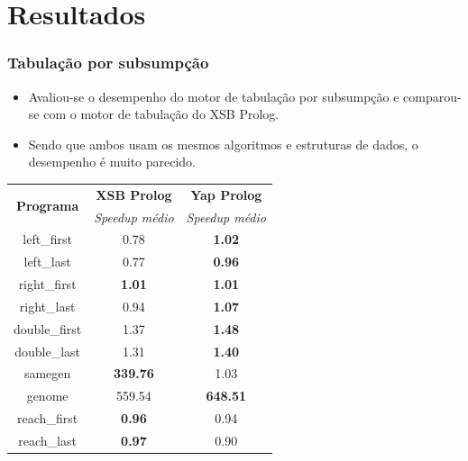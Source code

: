 \documentclass{beamer}
\begin{document}
\begin{frame}
\begin{columns}[t]
     \end{columns}
\end{frame}

\section{Resultados}

\begin{frame}
   \frametitle{Tabulação por subsumpção}
   \begin{itemize}
      \item Avaliou-se o desempenho do motor de tabulação por subsumpção e comparou-se com
      o motor de tabulação do XSB Prolog.
      \item Sendo que ambos usam os mesmos algoritmos e estruturas de dados, o desempenho é muito
      parecido.
   \end{itemize}
   \pause
   {\footnotesize
   \begin{center}
     \begin{tabular}{ccc}
      \hline
       \hline
       \multirow{2}{*}{\textbf{Programa}} & \textbf{XSB Prolog} & \textbf{Yap Prolog} \\
       & \textit{\small{Speedup médio}} & \textit{\small{Speedup médio}} \\
      \hline
      \hline
   left\_first & 0.78 & \textbf{1.02} \\
   left\_last & 0.77  & \textbf{0.96} \\
   right\_first & \textbf{1.01} & \textbf{1.01} \\
   right\_last & 0.94 & \textbf{1.07} \\
   double\_first & 1.37 & \textbf{1.48} \\
   double\_last & 1.31 & \textbf{1.40} \\
   samegen & \textbf{339.76} & 1.03 \\
   genome & 559.54 & \textbf{648.51} \\
   reach\_first  & \textbf{0.96} & 0.94 \\
   reach\_last  & \textbf{0.97} & 0.90 \\
   \hline
   \hline
   \end{tabular}
   \end{center}}
\end{frame}
\end{document}
